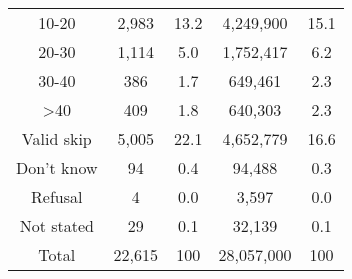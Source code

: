 \documentclass[11pt,twoside]{article}
\begin{document}
\begin{center}
\begin{tabular}{c||c|c|c|c}
10-20 & 2,983    &     13.2    &            4,249,900  &  15.1\\
20-30 & 1,114    &      5.0   &              1,752,417  &   6.2\\
30-40 & 386      &        1.7   &              649,461    &    2.3\\
>40 & 409    &             1.8   &              640,303    &    2.3\\
Valid skip & 5,005        &      22.1        &       4,652,779  &  16.6\\
Don’t know & 94       &     0.4      &   94,488  &         0.3\\
Refusal & 4    &        0.0   &   3,597   &    0.0\\
Not stated & 29 & 0.1  & 32,139  & 0.1\\\hline\hline
Total & 22,615     &      100         &        28,057,000  & 100\\\hline
\end{tabular}
\end{center}
\end{document}
